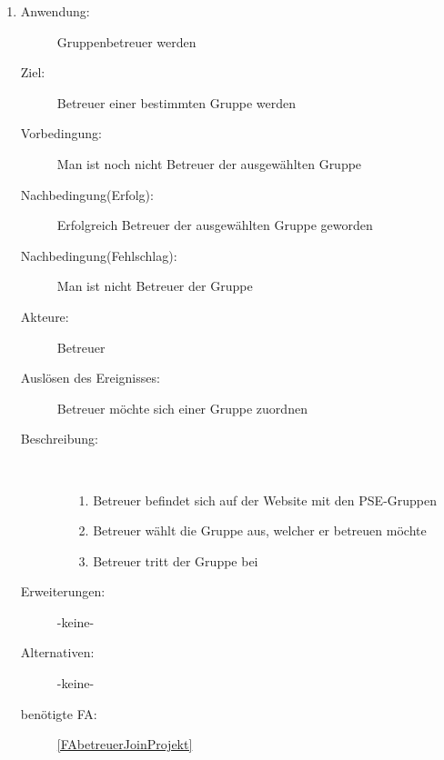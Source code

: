 \documentclass[parskip=full]{scrartcl}
\newcommand{\swtLabel}[1]{\textbf{/#1\arabic*0/}}
\begin{document}
\begin{enumerate} [label=\swtLabel{B}]
 
  \item \label{UCbetreuerJoinProjekt}
	\begin{description}
  		\item[Anwendung:] Gruppenbetreuer werden
  		\item[Ziel:] Betreuer einer bestimmten Gruppe werden
  		\item[Vorbedingung:] Man ist noch nicht Betreuer der ausgewählten Gruppe
  		\item[Nachbedingung(Erfolg):] Erfolgreich Betreuer der ausgewählten
  		Gruppe geworden
  		\item[Nachbedingung(Fehlschlag):] Man ist nicht Betreuer der Gruppe
  		\item[Akteure:] Betreuer
  		\item[Auslösen des Ereignisses:] Betreuer möchte sich einer Gruppe
  		zuordnen
  		\item[Beschreibung:]~
  	\begin{enumerate} 
  	  \item[1.] Betreuer befindet sich auf der Website mit den \gls{PSE}-Gruppen
  	  \item[2.] Betreuer wählt die Gruppe aus, welcher er betreuen möchte
  	  \item[3.] Betreuer tritt der Gruppe bei
  	\end{enumerate}
  	\item[Erweiterungen:] -keine-
  	\item[Alternativen:] -keine-
  	\item[benötigte FA:] \ref{FAbetreuerJoinProjekt}
  \end{description}
  

\end{enumerate}
\end{document}
